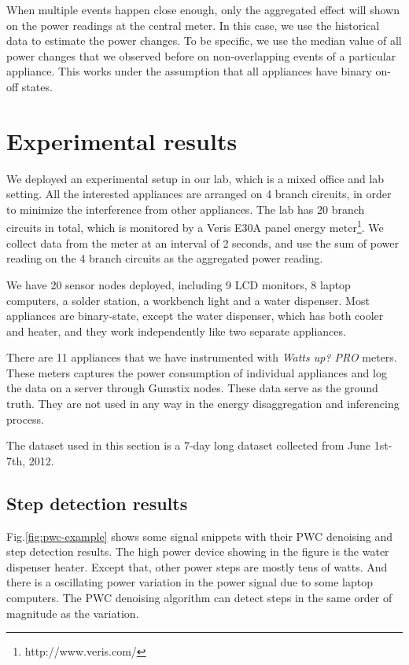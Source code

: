 When multiple events happen close enough, only the aggregated effect will shown on the power readings at the central meter. In this case, we use the historical data to estimate the power changes. To be specific, we use the median value of all power changes that we observed before on non-overlapping events of a particular appliance. This works under the assumption that all appliances have binary on-off states.

\section{Experimental results}

We deployed an experimental setup in our lab, which is a mixed office and lab setting. All the interested appliances are arranged on 4 branch circuits, in order to minimize the interference from other appliances. The lab has 20 branch circuits in total, which is monitored by a Veris E30A panel energy meter\footnote{http://www.veris.com/}. We collect data from the meter at an interval of 2 seconds, and use the sum of power reading on the 4 branch circuits as the aggregated power reading.

We have 20 sensor nodes deployed, including 9 LCD monitors, 8 laptop computers, a solder station, a workbench light and a water dispenser. Most appliances are binary-state, except the water dispenser, which has both cooler and heater, and they work independently like two separate appliances. 

There are 11 appliances that we have instrumented with \textit{Watts up? PRO} meters. These meters captures the power consumption of individual appliances and log the data on a server through Gumstix nodes. These data serve as the ground truth. They are not used in any way in the energy disaggregation and inferencing process. 

The dataset used in this section is a 7-day long dataset collected from June 1st-7th, 2012. 

\subsection{Step detection results}

Fig.\ref{fig:pwc-example} shows some signal snippets with their PWC denoising and step detection results. The high power device showing in the figure is the water dispenser heater. Except that, other power steps are mostly tens of watts. And there is a oscillating power variation in the power signal due to some laptop computers. The PWC denoising algorithm can detect steps in the same order of magnitude as the variation. 



